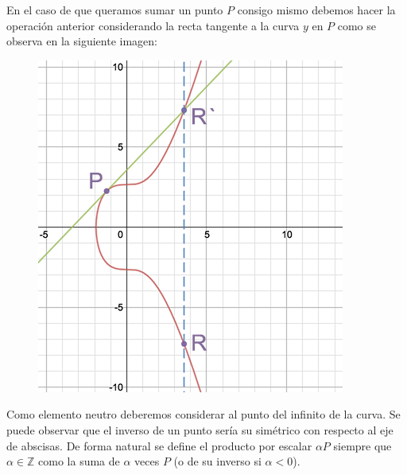 \documentclass[twoside]{article}
\theoremstyle{definition}
\newcommand{\Z}{\mathbb{Z}}
\begin{document}
En el caso de que queramos sumar un punto $P$ consigo mismo debemos hacer la operación anterior considerando la recta tangente a la curva $y$ en $P$ como se observa en la siguiente imagen:

\begin{figure}[h!]
\includegraphics[scale=0.4]{pmasp}
\end{figure}

Como elemento neutro deberemos considerar al punto del infinito de la curva. Se puede observar que el inverso de un punto sería su simétrico con respecto al eje de abscisas. De forma natural se define el producto por escalar $\alpha P$ siempre que $\alpha\in\Z$ como la suma de $\alpha$ veces $P$ (o de su inverso si $\alpha<0$).
\end{document}
